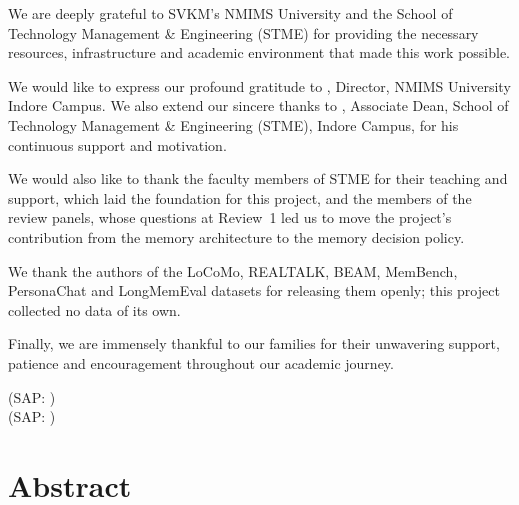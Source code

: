 \documentclass[12pt,a4paper,oneside]{report}
\begin{document}
We are deeply grateful to SVKM's NMIMS University and the School of Technology
Management \& Engineering (STME) for providing the necessary resources,
infrastructure and academic environment that made this work possible.

We would like to express our profound gratitude to \textbf{\director},
Director, NMIMS University Indore Campus. We also extend our sincere thanks to
\textbf{\assocdean}, Associate Dean, School of Technology Management \&
Engineering (STME), Indore Campus, for his continuous support and motivation.

We would also like to thank the faculty members of STME for their teaching and
support, which laid the foundation for this project, and the members of the
review panels, whose questions at Review~1 led us to move the project's
contribution from the memory architecture to the memory decision policy.

We thank the authors of the LoCoMo, REALTALK, BEAM, MemBench, PersonaChat and
LongMemEval datasets for releasing them openly; this project collected no data
of its own.

Finally, we are immensely thankful to our families for their unwavering
support, patience and encouragement throughout our academic journey.

\vspace{1.2cm}
\begin{flushright}
\textbf{\studentA} (SAP: \sapA)\\
\textbf{\studentB} (SAP: \sapB)
\end{flushright}

\chapter*{Abstract}


\tableofcontents
\clearpage
{}
{}
\listoffigures
\clearpage
{}
{}
\listoftables
\clearpage


\clearpage
{}
\setcounter{page}{1}








\clearpage
{}
{}



\appendix

\end{document}
